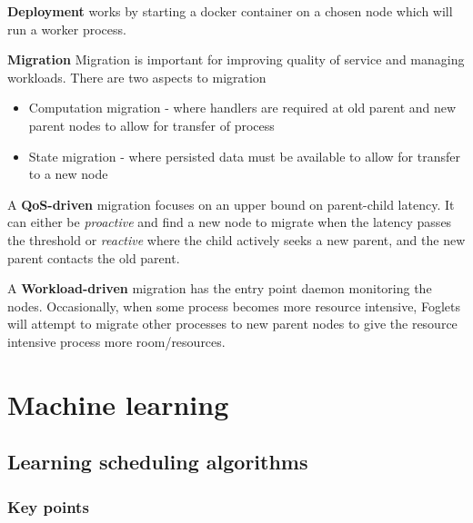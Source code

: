 \documentclass{sty/SizheArticle}
\begin{document}
\textbf{Deployment} works by starting a docker container on a chosen node
which will run a worker process.

\textbf{Migration}
Migration is important for improving quality of service and managing workloads.
There are two aspects to migration
\begin{itemize}
\item Computation migration - where handlers are required at old parent and new
parent nodes to allow for transfer of process
\item State migration - where persisted data must be available to allow for
transfer to a new node
\end{itemize}
A \textbf{QoS-driven} migration focuses on an upper bound on parent-child latency.
It can either be \textit{proactive} and find a new node to migrate when the
latency passes the threshold or \textit{reactive} where the child actively seeks
a new parent, and the new parent contacts the old parent.

A \textbf{Workload-driven} migration has the entry point daemon monitoring the
nodes. Occasionally, when some process becomes more resource intensive, Foglets
will attempt to migrate other processes to new parent nodes to give the resource
intensive process more room/resources.



\section{Machine learning}
\subsection{Learning scheduling algorithms}
\subsubsection{Key points}
\end{document}
